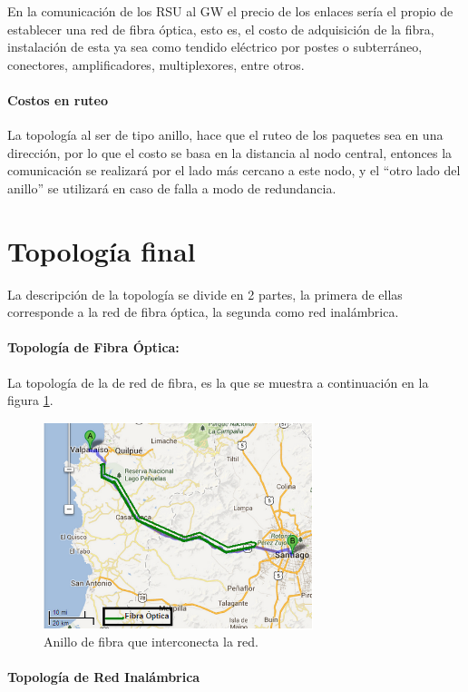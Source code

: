 \documentclass[12pt]{article}
\begin{document}
En la comunicación de los RSU al GW el precio de los enlaces sería el propio de establecer una red de 
fibra óptica, esto es, el costo de adquisición de la fibra, instalación de esta ya sea como tendido 
eléctrico por postes o subterráneo, conectores, amplificadores, multiplexores, entre otros.

\paragraph{Costos en ruteo}

La topología al ser de tipo anillo, hace que el ruteo de los paquetes sea en una dirección, por lo que 
el costo se basa en la distancia al nodo central, entonces la comunicación se realizará por el lado más 
cercano a este nodo, y el ``otro lado del anillo'' se utilizará en caso de falla a modo de redundancia.\\ 

\newpage
\section{Topología final}
La descripción de la topología se divide en 2 partes, la primera de ellas corresponde a la red de fibra 
óptica, la segunda como red inalámbrica.
\paragraph{Topología de Fibra Óptica:}
La topología de la de red de fibra, es la que se muestra a continuación en la figura \ref{fig:anillo_FO}.
\begin{figure}[H]
  \centering
      \includegraphics[width=0.7\textwidth]{anillo_FO}
	    \caption{Anillo de fibra que interconecta la red.}
	\label{fig:anillo_FO}
\end{figure}

\paragraph{Topología de Red Inalámbrica}
\end{document}
